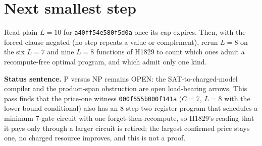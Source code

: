\documentclass[11pt]{article}
\begin{document}
\section*{Next smallest step}
Read plain $L=10$ for \texttt{a40ff54e580f5d0a} once its cap expires. Then, with the forced clause negated (no step repeats a value or complement), rerun $L=8$ on the six $L=7$ and nine $L=8$ functions of H1829 to count which ones admit a recompute-free optimal program, and which admit only one kind.

\bigskip
\noindent\textbf{Status sentence.} P versus NP remains OPEN: the SAT-to-charged-model compiler and the product-span obstruction are open load-bearing arrows. This pass finds that the price-one witness \texttt{000f555b000f141a} ($C=7$, $L=8$ with the lower bound conditional) also has an 8-step two-register program that schedules a minimum 7-gate circuit with one forget-then-recompute, so H1829's reading that it pays only through a larger circuit is retired; the largest confirmed price stays one, no charged resource improves, and this is not a proof.
\end{document}
